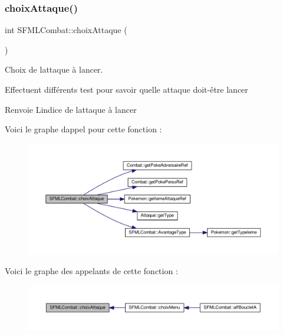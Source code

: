 \subsubsection{\texorpdfstring{choix\+Attaque()}{choixAttaque()}}
{\footnotesize\ttfamily int S\+F\+M\+L\+Combat\+::choix\+Attaque (\begin{DoxyParamCaption}{ }\end{DoxyParamCaption})\hspace{0.3cm}{\ttfamily [private]}}



Choix de l\textquotesingle{}attaque à lancer. 

Effectuent différents test pour savoir quelle attaque doit-\/être lancer \begin{DoxyReturn}{Renvoie}
L\textquotesingle{}indice de l\textquotesingle{}attaque à lancer 
\end{DoxyReturn}
Voici le graphe d\textquotesingle{}appel pour cette fonction \+:\nopagebreak
\begin{figure}[H]
\begin{center}
\leavevmode
\includegraphics[width=350pt]{class_s_f_m_l_combat_ab1f7a0fa82f0cfd9c0a0e1c321f5f7e7_cgraph}
\end{center}
\end{figure}
Voici le graphe des appelants de cette fonction \+:\nopagebreak
\begin{figure}[H]
\begin{center}
\leavevmode
\includegraphics[width=350pt]{class_s_f_m_l_combat_ab1f7a0fa82f0cfd9c0a0e1c321f5f7e7_icgraph}
\end{center}
\end{figure}
\mbox{\label{class_s_f_m_l_combat_ad72f480db9eb3f134e3736b1acb228c8}} 
